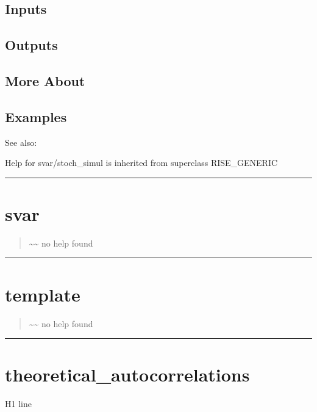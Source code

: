 \documentclass[letterpaper,10pt,english]{sphinxmanual}
\begin{document}
\subsection{Inputs}
\label{classes/models/@svar/svar:id135}

\subsection{Outputs}
\label{classes/models/@svar/svar:id136}

\subsection{More About}
\label{classes/models/@svar/svar:id137}

\subsection{Examples}
\label{classes/models/@svar/svar:id138}
See also:

Help for svar/stoch\_simul is inherited from superclass RISE\_GENERIC


\bigskip\hrule{}\bigskip



\section{svar}
\label{classes/models/@svar/svar:id139}\label{classes/models/@svar/svar:svar}\begin{quote}

\textasciitilde{}\textasciitilde{} no help found
\end{quote}


\bigskip\hrule{}\bigskip



\section{template}
\label{classes/models/@svar/svar:id140}\label{classes/models/@svar/svar:template}\begin{quote}

\textasciitilde{}\textasciitilde{} no help found
\end{quote}


\bigskip\hrule{}\bigskip



\section{theoretical\_autocorrelations}
\label{classes/models/@svar/svar:theoretical-autocorrelations}\label{classes/models/@svar/svar:id141}
H1 line
\end{document}

